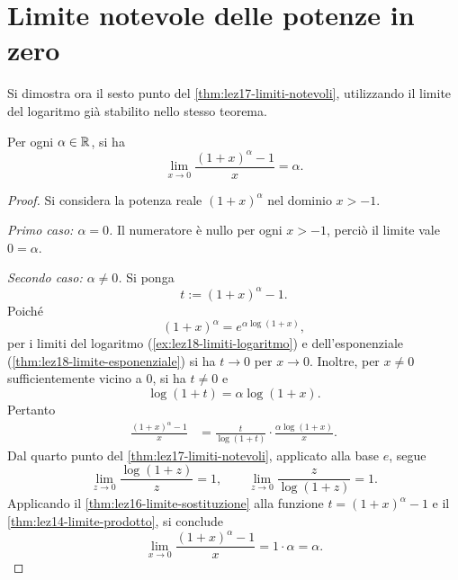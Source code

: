 \section{Limite notevole delle potenze in zero}
\label{sec:lez19-limite-potenze}

Si dimostra ora il sesto punto del
\cref{thm:lez17-limiti-notevoli}, utilizzando
il limite del logaritmo già stabilito nello stesso teorema.

\begin{proposition}
\label{prop:lez19-limite-potenze}
Per ogni \(\alpha\in\mathbb{R}\), si ha
\[
  \lim_{x\to0}\frac{(1+x)^\alpha-1}{x}=\alpha.
\]
\end{proposition}

\begin{proof}
Si considera la potenza reale \((1+x)^\alpha\)
nel dominio \(x>-1\).

\emph{Primo caso: \(\alpha=0\).}
Il numeratore è nullo per ogni \(x>-1\),
perciò il limite vale \(0=\alpha\).

\emph{Secondo caso: \(\alpha\ne0\).}
Si ponga
\[
  t:=(1+x)^\alpha-1.
\]
Poiché
\[
  (1+x)^\alpha=e^{\alpha\log(1+x)},
\]
per i limiti del logaritmo
(\cref{ex:lez18-limiti-logaritmo})
e dell'esponenziale (\cref{thm:lez18-limite-esponenziale})
si ha \(t\to0\) per \(x\to0\).
Inoltre, per \(x\ne0\) sufficientemente vicino a \(0\),
si ha \(t\ne0\) e
\[
  \log(1+t)=\alpha\log(1+x).
\]
Pertanto
\[
\begin{aligned}
  \frac{(1+x)^\alpha-1}{x}
  &=\frac{t}{\log(1+t)}
    \cdot\frac{\alpha\log(1+x)}{x}.
\end{aligned}
\]
Dal quarto punto del \cref{thm:lez17-limiti-notevoli},
applicato alla base \(e\), segue
\[
  \lim_{z\to0}\frac{\log(1+z)}z=1,
  \qquad
  \lim_{z\to0}\frac{z}{\log(1+z)}=1.
\]
Applicando il \cref{thm:lez16-limite-sostituzione}
alla funzione \(t=(1+x)^\alpha-1\) e il
\cref{thm:lez14-limite-prodotto}, si conclude
\[
  \lim_{x\to0}\frac{(1+x)^\alpha-1}{x}
  =1\cdot\alpha=\alpha.
\]
\end{proof}
